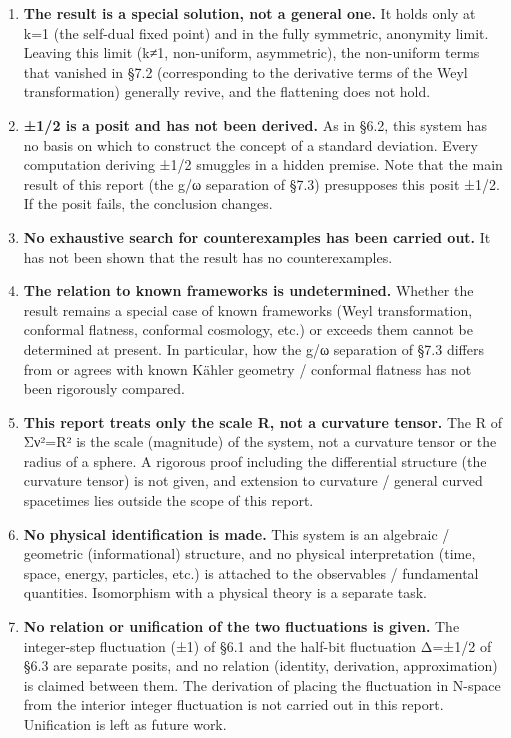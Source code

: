\documentclass[11pt]{ltjsarticle}
\begin{document}
\begin{enumerate}
\def\labelenumi{\arabic{enumi}.}
\item
  \textbf{The result is a special solution, not a general one.} It holds
  only at k=1 (the self-dual fixed point) and in the fully symmetric,
  anonymity limit. Leaving this limit (k≠1, non-uniform, asymmetric),
  the non-uniform terms that vanished in §7.2 (corresponding to the
  derivative terms of the Weyl transformation) generally revive, and the
  flattening does not hold.
\item
  \textbf{±1/2 is a posit and has not been derived.} As in §6.2, this
  system has no basis on which to construct the concept of a standard
  deviation. Every computation deriving ±1/2 smuggles in a hidden
  premise. Note that the main result of this report (the g/ω separation
  of §7.3) presupposes this posit ±1/2. If the posit fails, the
  conclusion changes.
\item
  \textbf{No exhaustive search for counterexamples has been carried
  out.} It has not been shown that the result has no counterexamples.
\item
  \textbf{The relation to known frameworks is undetermined.} Whether the
  result remains a special case of known frameworks (Weyl
  transformation, conformal flatness, conformal cosmology, etc.) or
  exceeds them cannot be determined at present. In particular, how the
  g/ω separation of §7.3 differs from or agrees with known Kähler
  geometry / conformal flatness has not been rigorously compared.
\item
  \textbf{This report treats only the scale R, not a curvature tensor.}
  The R of Σν²=R² is the scale (magnitude) of the system, not a
  curvature tensor or the radius of a sphere. A rigorous proof including
  the differential structure (the curvature tensor) is not given, and
  extension to curvature / general curved spacetimes lies outside the
  scope of this report.
\item
  \textbf{No physical identification is made.} This system is an
  algebraic / geometric (informational) structure, and no physical
  interpretation (time, space, energy, particles, etc.) is attached to
  the observables / fundamental quantities. Isomorphism with a physical
  theory is a separate task.
\item
  \textbf{No relation or unification of the two fluctuations is given.}
  The integer-step fluctuation (±1) of §6.1 and the half-bit fluctuation
  Δ=±1/2 of §6.3 are separate posits, and no relation (identity,
  derivation, approximation) is claimed between them. The derivation of
  placing the fluctuation in N-space from the interior integer
  fluctuation is not carried out in this report. Unification is left as
  future work.
\end{enumerate}
\end{document}

